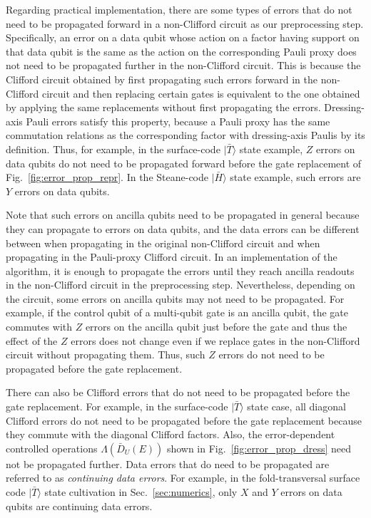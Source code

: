 \documentclass[
 reprint,
 amsmath,amssymb,
 pra,superscriptaddress, nofootinbib
]{revtex4-2}
\theoremstyle{definition}
\theoremstyle{plain}
\begin{document}
Regarding practical implementation, there are some types of errors that do not need to be propagated forward in a non-Clifford circuit as our preprocessing step. 
Specifically, an error on a data qubit whose action on a factor having support on that data qubit is the same as the action on the corresponding Pauli proxy does not need to be propagated further in the non-Clifford circuit. 
This is because the Clifford circuit obtained by first propagating such errors forward in the non-Clifford circuit and then replacing certain gates is equivalent to the one obtained by applying the same replacements without first propagating the errors.
Dressing-axis Pauli errors satisfy this property, because a Pauli proxy has the same commutation relations as the corresponding factor with dressing-axis Paulis by its definition.
Thus, for example, in the surface-code $|\bar{T}\rangle$ state example, $Z$ errors on data qubits do not need to be propagated forward before the gate replacement of Fig.~\ref{fig:error_prop_repr}.
In the Steane-code $|\bar{H}\rangle$ state example, such errors are $Y$ errors on data qubits.

Note that such errors on ancilla qubits need to be propagated in general because they can propagate to errors on data qubits, and the data errors can be different between when propagating in the original non-Clifford circuit and when propagating in the Pauli-proxy Clifford circuit. 
In an implementation of the algorithm, it is enough to propagate the errors until they reach ancilla readouts in the non-Clifford circuit in the preprocessing step.
Nevertheless, depending on the circuit, some errors on ancilla qubits may not need to be propagated. For example, if the control qubit of a multi-qubit gate is an ancilla qubit, the gate commutes with $Z$ errors on the ancilla qubit just before the gate and thus the effect of the $Z$ errors does not change even if we replace gates in the non-Clifford circuit without propagating them. Thus, such $Z$ errors do not need to be propagated before the gate replacement.

There can also be Clifford errors that do not need to be propagated before the gate replacement. For example, in the surface-code $|\bar{T}\rangle$ state case, all diagonal Clifford errors do not need to be propagated before the gate replacement because they commute with the diagonal Clifford factors.
Also, the error-dependent controlled operations $\Lambda(\bar{D}_U(E))$ shown in Fig.~\ref{fig:error_prop_dress} need not be propagated further.
Data errors that do need to be propagated are referred to as \emph{continuing data errors}.
For example, in the fold-transversal surface code $|\bar{T}\rangle$ state cultivation in Sec.~\ref{sec:numerics}, only $X$ and $Y$ errors on data qubits are continuing data errors.
\end{document}
